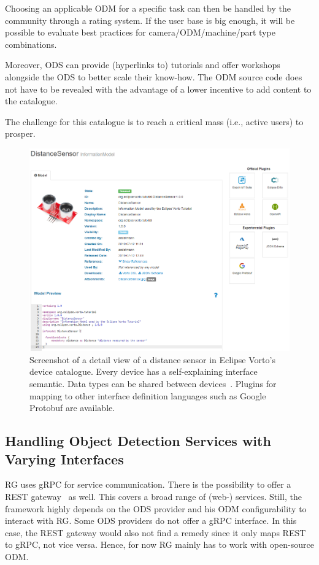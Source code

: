Choosing an applicable ODM for a specific task can then be handled by the community through a rating system. If the user base is big enough, it will be possible to evaluate best practices for camera/ODM/machine/part type combinations.

Moreover, ODS can provide (hyperlinks to) tutorials and offer workshops alongside the ODS to better scale their know-how. The ODM source code does not have to be revealed with the advantage of a lower incentive to add content to the catalogue.

The challenge for this catalogue is to reach a critical mass (i.e., active users) to prosper.

\begin{figure}[ht]
    \centering
    \includegraphics[width=\textwidth]{img/ScreenshotVortoDistanceSensor.png}
    \caption[Distance sensor in Eclipse Vorto's device catalogue]{Screenshot of a detail view of a distance sensor in Eclipse Vorto's device catalogue. Every device has a self-explaining interface semantic. Data types can be shared between devices~\cite{Eclipse2019Vorto2019}. Plugins for mapping to other interface definition languages such as Google Protobuf are available.}
    \label{fig:vorto2}
\end{figure}

\subsection{Handling Object Detection Services with Varying Interfaces}
RG uses gRPC for service communication. There is the possibility to offer a REST gateway~\cite{gRPC-Gateway-Documentation2017Grpc-gateway.2018} as well. This covers a broad range of (web-) services. Still, the framework highly depends on the ODS provider and his ODM configurability to interact with RG. Some ODS providers do not offer a gRPC interface. In this case, the REST gateway would also not find a remedy since it only maps REST to gRPC, not vice versa. Hence, for now RG mainly has to work with open-source ODM. 


